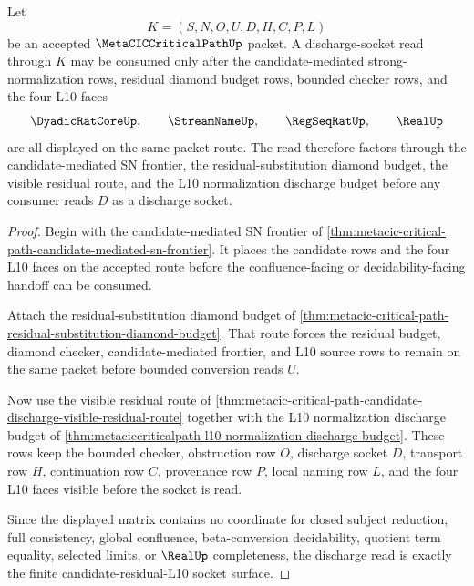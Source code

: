 \begin{theorem}
\label{thm:metacic-critical-path-candidate-discharge-matrix}
Let
$$
K=(S,N,O,U,D,H,C,P,L)
$$
be an accepted $\MetaCICCriticalPathUp$ packet. A discharge-socket read through $K$ may be consumed only after the candidate-mediated strong-normalization rows, residual diamond budget rows, bounded checker rows, and the four L10 faces
$$
\DyadicRatCoreUp,\qquad
\StreamNameUp,\qquad
\RegSeqRatUp,\qquad
\RealUp
$$
are all displayed on the same packet route. The read therefore factors through the candidate-mediated SN frontier, the residual-substitution diamond budget, the visible residual route, and the L10 normalization discharge budget before any consumer reads $D$ as a discharge socket.
\end{theorem}
\begin{proof}
Begin with the candidate-mediated SN frontier of \autoref{thm:metacic-critical-path-candidate-mediated-sn-frontier}. It places the candidate rows and the four L10 faces on the accepted route before the confluence-facing or decidability-facing handoff can be consumed.

Attach the residual-substitution diamond budget of \autoref{thm:metacic-critical-path-residual-substitution-diamond-budget}. That route forces the residual budget, diamond checker, candidate-mediated frontier, and L10 source rows to remain on the same packet before bounded conversion reads $U$.

Now use the visible residual route of \autoref{thm:metacic-critical-path-candidate-discharge-visible-residual-route} together with the L10 normalization discharge budget of \autoref{thm:metaciccriticalpath-l10-normalization-discharge-budget}. These rows keep the bounded checker, obstruction row $O$, discharge socket $D$, transport row $H$, continuation row $C$, provenance row $P$, local naming row $L$, and the four L10 faces visible before the socket is read.

Since the displayed matrix contains no coordinate for closed subject reduction, full consistency, global confluence, beta-conversion decidability, quotient term equality, selected limits, or $\RealUp$ completeness, the discharge read is exactly the finite candidate-residual-L10 socket surface.
\end{proof}

